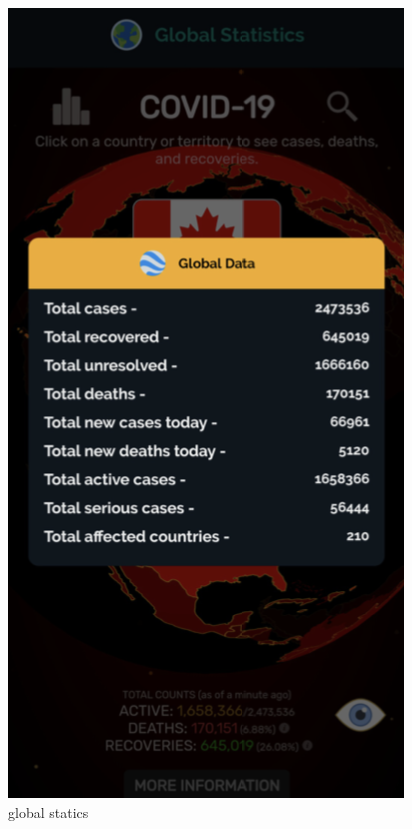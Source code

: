\begin{center}
\includegraphics[scale=0.55]{stat.png}\\[0.75cm]
\caption{global statics}
\end{center}
